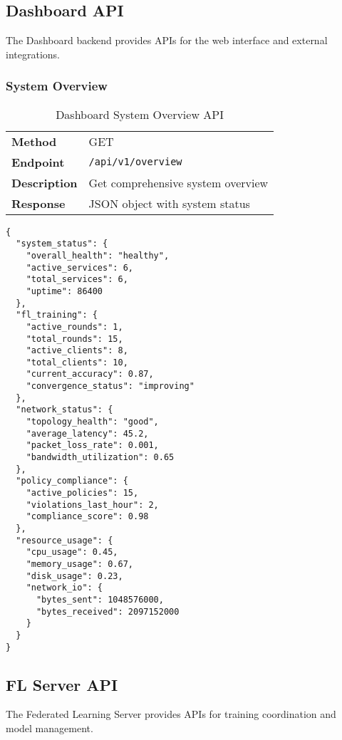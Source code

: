 \subsection{Dashboard API}

The Dashboard backend provides APIs for the web interface and external integrations.

\subsubsection{System Overview}

\begin{table}[H]
\centering
\caption{Dashboard System Overview API}
\label{tab:dashboard-overview-api}
\begin{tabularx}{\textwidth}{@{}lX@{}}
\toprule
\textbf{Method} & GET \\
\textbf{Endpoint} & \texttt{/api/v1/overview} \\
\textbf{Description} & Get comprehensive system overview \\
\textbf{Response} & JSON object with system status \\
\bottomrule
\end{tabularx}
\end{table}

\begin{lstlisting}[style=jsoncode, caption=System Overview Response]
{
  "system_status": {
    "overall_health": "healthy",
    "active_services": 6,
    "total_services": 6,
    "uptime": 86400
  },
  "fl_training": {
    "active_rounds": 1,
    "total_rounds": 15,
    "active_clients": 8,
    "total_clients": 10,
    "current_accuracy": 0.87,
    "convergence_status": "improving"
  },
  "network_status": {
    "topology_health": "good",
    "average_latency": 45.2,
    "packet_loss_rate": 0.001,
    "bandwidth_utilization": 0.65
  },
  "policy_compliance": {
    "active_policies": 15,
    "violations_last_hour": 2,
    "compliance_score": 0.98
  },
  "resource_usage": {
    "cpu_usage": 0.45,
    "memory_usage": 0.67,
    "disk_usage": 0.23,
    "network_io": {
      "bytes_sent": 1048576000,
      "bytes_received": 2097152000
    }
  }
}
\end{lstlisting}

\subsection{FL Server API}

The Federated Learning Server provides APIs for training coordination and model management.

